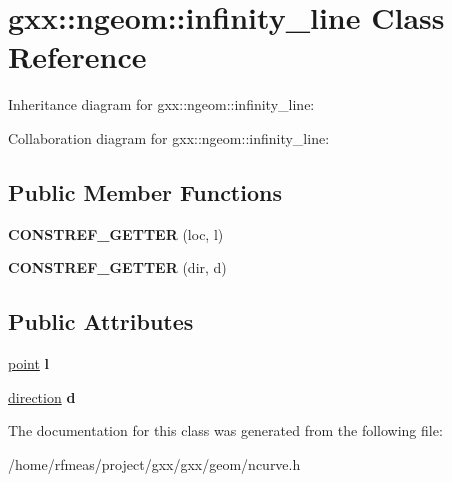 \hypertarget{classgxx_1_1ngeom_1_1infinity__line}{}\section{gxx\+:\+:ngeom\+:\+:infinity\+\_\+line Class Reference}
\label{classgxx_1_1ngeom_1_1infinity__line}


Inheritance diagram for gxx\+:\+:ngeom\+:\+:infinity\+\_\+line\+:


Collaboration diagram for gxx\+:\+:ngeom\+:\+:infinity\+\_\+line\+:
\subsection*{Public Member Functions}
\begin{DoxyCompactItemize}
\item 
{\bfseries C\+O\+N\+S\+T\+R\+E\+F\+\_\+\+G\+E\+T\+T\+ER} (loc, l)\hypertarget{classgxx_1_1ngeom_1_1infinity__line_af03e98f06ae86fbd6cfb097300a588cd}{}\label{classgxx_1_1ngeom_1_1infinity__line_af03e98f06ae86fbd6cfb097300a588cd}

\item 
{\bfseries C\+O\+N\+S\+T\+R\+E\+F\+\_\+\+G\+E\+T\+T\+ER} (dir, d)\hypertarget{classgxx_1_1ngeom_1_1infinity__line_aeb9dffa1ad6457ae09ea68a5d7a4b643}{}\label{classgxx_1_1ngeom_1_1infinity__line_aeb9dffa1ad6457ae09ea68a5d7a4b643}

\end{DoxyCompactItemize}
\subsection*{Public Attributes}
\begin{DoxyCompactItemize}
\item 
\hyperlink{classgxx_1_1ngeom_1_1point}{point} {\bfseries l}\hypertarget{classgxx_1_1ngeom_1_1infinity__line_aa4665a47959195caf12104a1c2e62433}{}\label{classgxx_1_1ngeom_1_1infinity__line_aa4665a47959195caf12104a1c2e62433}

\item 
\hyperlink{classgxx_1_1ngeom_1_1direction}{direction} {\bfseries d}\hypertarget{classgxx_1_1ngeom_1_1infinity__line_ab4dd14840bd401063d2b9fd657455c37}{}\label{classgxx_1_1ngeom_1_1infinity__line_ab4dd14840bd401063d2b9fd657455c37}

\end{DoxyCompactItemize}


The documentation for this class was generated from the following file\+:\begin{DoxyCompactItemize}
\item 
/home/rfmeas/project/gxx/gxx/geom/ncurve.\+h\end{DoxyCompactItemize}
